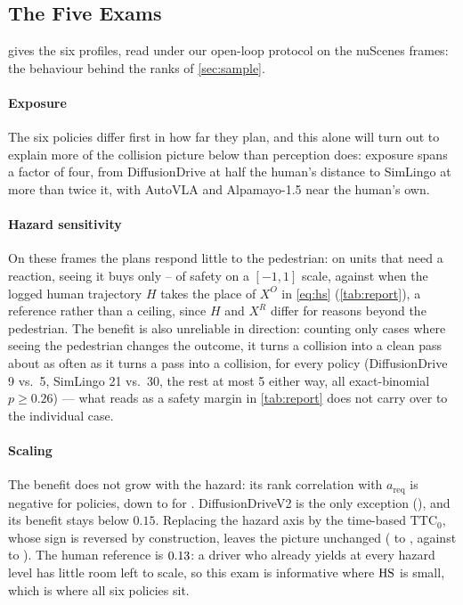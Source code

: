 \subsection{The Five Exams}
\label{sec:diagnosis}



 gives the six profiles, read under our open-loop protocol on the nuScenes frames: the behaviour behind the ranks of \cref{sec:sample}.

\paragraph{Exposure}
The six policies differ first in how far they plan, and this alone will turn out to explain more of
the collision picture below than perception does: exposure spans a factor of four, from DiffusionDrive
at half the human's distance to SimLingo at more than twice it, with AutoVLA and Alpamayo-1.5 near the
human's own.

\paragraph{Hazard sensitivity}
On these frames the plans respond little to the pedestrian: on units that need a reaction, seeing it buys only \NumHSlo--\NumHShi{} of safety on a $[-1,1]$ scale, against \NumHumanRef{} when the logged human trajectory $H$ takes the place of $X^{O}$ in \eqref{eq:hs} (\cref{tab:report}), a reference rather than a ceiling, since $H$ and $X^{R}$ differ for reasons beyond the pedestrian. The benefit is also unreliable in direction:
counting only cases where seeing the pedestrian changes the outcome, it turns a collision into a clean
pass about as often as it turns a pass into a collision, for every policy (DiffusionDrive 9 vs.\ 5,
SimLingo 21 vs.\ 30, the rest at most 5 either way, all exact-binomial $p\ge0.26$) --- what reads as a safety margin in \cref{tab:report} does not carry over to the individual case.

\paragraph{Scaling}
The benefit does not grow with the hazard: its rank
correlation with $a_{\mathrm{req}}$ is negative for \NumScalNeg{} policies, down to \NumScalLo{} for
\NumScalWorst. DiffusionDriveV2 is the only exception (\NumScalHi), and its benefit stays below
$0.15$. Replacing the hazard axis by the time-based $\mathrm{TTC}_0$, whose sign is reversed by
construction, leaves the picture unchanged (\NumScalTtcLo{} to \NumScalTtcHi, against \NumScalLo{} to
\NumScalHi). The human reference is $0.13$: a driver who already yields at every hazard level has little room left to scale, so this exam is informative where $\mathrm{HS}$ is small, which is where all six policies sit.

